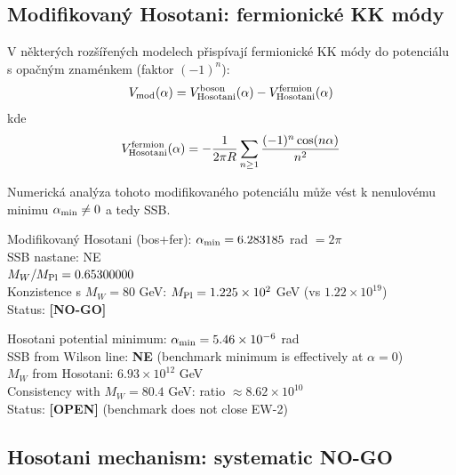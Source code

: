 \documentclass[12pt,a4paper]{article}
\begin{document}
\subsection{Modifikovaný Hosotani: fermionické KK módy}

V některých rozšířených modelech přispívají fermionické KK módy do potenciálu s opačným znaménkem (faktor $(-1)^n$):
\begin{equation}
V_{\rm mod}(\alpha) = V_{\rm Hosotani}^{\rm boson}(\alpha) - V_{\rm Hosotani}^{\rm fermion}(\alpha)
\end{equation}
kde
\begin{equation}
V_{\rm Hosotani}^{\rm fermion}(\alpha) = -\frac{1}{2\pi R}\sum_{n\geq 1} \frac{(-1)^n \cos(n\alpha)}{n^2}
\end{equation}

Numerická analýza tohoto modifikovaného potenciálu může vést k nenulovému minimu $\alpha_{\rm min} \neq 0$ a tedy SSB.


\begin{statusbox}
Modifikovaný Hosotani (bos+fer): $\alpha_{\rm min}=6.283185$ rad $=2\pi$\\
SSB nastane: NE\\
$M_W/M_{\rm Pl} = 0.65300000$\\
Konzistence s $M_W=80$ GeV: $M_{\rm Pl}=1.225\times10^2$ GeV (vs $1.22\times10^{19}$)\\
Status: \textbf{[NO-GO]}
\end{statusbox}

\begin{statusbox}
Hosotani potential minimum: $\alpha_{\rm min}=5.46\times10^{-6}$ rad\\
SSB from Wilson line: \textbf{NE} (benchmark minimum is effectively at $\alpha=0$)\\
$M_W$ from Hosotani: $6.93\times10^{12}$ GeV\\
Consistency with $M_W=80.4$ GeV: ratio $\approx 8.62\times10^{10}$\\
Status: \textbf{[OPEN]} (benchmark does not close EW-2)
\end{statusbox}

\subsection{Hosotani mechanism: systematic NO-GO}
\label{sec:hosotani-nogo}
\end{document}
